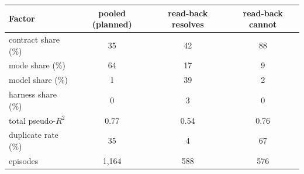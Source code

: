 \begin{tabular}{lccc}
\toprule
Factor & pooled (planned) & read-back resolves & read-back cannot \\
\midrule
contract share (\%) & 35 & 42 & 88 \\
mode share (\%) & 64 & 17 & 9 \\
model share (\%) & 1 & 39 & 2 \\
harness share (\%) & 0 & 3 & 0 \\
\midrule
total pseudo-$R^2$ & 0.77 & 0.54 & 0.76 \\
duplicate rate (\%) & 35 & 4 & 67 \\
episodes & 1,164 & 588 & 576 \\
\bottomrule
\end{tabular}